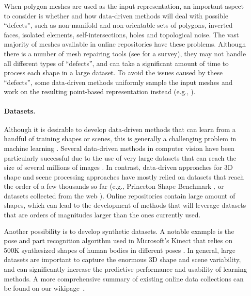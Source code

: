 When polygon meshes are used as the input representation, an important aspect to consider is whether and how data-driven methods will deal with possible ``defects'', such as non-manifold and non-orientable sets of polygons, inverted faces, isolated elements, self-intersections, holes and topological noise. The vast majority of meshes available in online repositories have these problems. Although there is a number of mesh repairing tools (see \cite{Campen:PGP:2012} for a survey), they may not handle all different types of ``defects'', and can take a significant amount of time to process each shape in a large dataset. To avoid the issues caused by these ``defects'', some data-driven methods uniformly sample the input meshes and work on the resulting point-based representation instead (e.g., \cite{Chaudhuri:2011:prabm,Kim:2013:lpt}).

\paragraph*{Datasets.} Although it is desirable to develop data-driven methods that can learn from a handful of training shapes or scenes, this is generally a challenging problem in machine learning \cite{Fei:OSL:2006}. Several data-driven methods in computer vision have been particularly successful due to the use of very large datasets that can reach the size of several millions of images \cite{Torralba:2008:MTI}. In contrast, data-driven approaches for 3D shape and scene processing approaches have mostly relied on datasets that reach the order of a few thousands so far (e.g., Princeton Shape Benchmark \cite{Shilane:2004:TPS}, or datasets collected from the web \cite{Kim:2013:lpt}). Online repositories contain large amount of shapes, which can lead to the development of methods that will leverage datasets that are orders of magnitudes larger than the ones currently used.
%

Another possibility is to develop synthetic datasets. A notable example is the pose and part recognition algorithm used in Microsoft's Kinect that relies on 500K synthesized shapes of human bodies in different poses \cite{Shotton:2011:RLH}. In general, large datasets are important to capture the enormous 3D shape and scene variability, and can significantly increase the predictive performance and usability of learning methods. A more comprehensive summary of existing online data collections can be found on our wikipage~\cite{Wikipage}.


